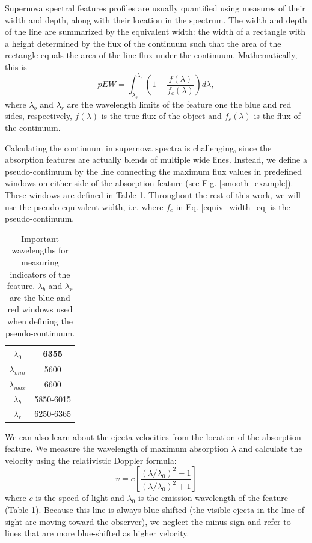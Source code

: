 Supernova spectral features profiles are usually quantified using measures of their width and depth, along with their location in the spectrum. The width and depth of the line are summarized by the equivalent width: the width of a rectangle with a height determined by the flux of the continuum such that the area of the rectangle equals the area of the line flux under the continuum. Mathematically, this is
\begin{equation}
    pEW = \displaystyle\int_{\lambda_b}^{\lambda_r}
    \left(1-\frac{f(\lambda)}{f_c(\lambda)}\right)d\lambda,
    \label{equiv_width_eq}
\end{equation}
where $\lambda_b$ and $\lambda_r$ are the wavelength limits of the feature one the blue and red sides, respectively, $f(\lambda)$ is the true flux of the object and $f_c(\lambda)$ is the flux of the continuum.

Calculating the continuum in supernova spectra is challenging, since the absorption features are actually blends of multiple wide lines. Instead, we define a pseudo-continuum by the line connecting the maximum flux values in predefined windows on either side of the absorption feature (see Fig. \ref{smooth_example}). These windows are defined in Table \ref{wavelength_ranges}. Throughout the rest of this work, we will use the pseudo-equivalent width, i.e. where $f_c$ in Eq. \ref{equiv_width_eq} is the pseudo-continuum.

\begin{table}[!htb]
    \centering
    \begin{tabular}{|c|c|}\hline
         $\lambda_0$ & 6355 \\\hline
         $\lambda_{min}$ & 5600 \\\hline
         $\lambda_{max}$ & 6600 \\\hline
         $\lambda_b$ & 5850-6015 \\\hline
         $\lambda_r$ & 6250-6365 \\\hline
    \end{tabular}
    \caption{Important wavelengths for measuring indicators of the \siliconii\; feature. $\lambda_b$ and $\lambda_r$ are the blue and red windows used when defining the pseudo-continuum.}
    \label{wavelength_ranges}
\end{table}

We can also learn about the ejecta velocities from the location of the absorption feature. We measure the wavelength of maximum absorption $\lambda$ and calculate the velocity using the relativistic Doppler formula:
\begin{equation}
v = c\left[\frac{(\lambda/\lambda_0)^2 -1}{(\lambda/\lambda_0)^2 +1}\right]
\label{doppler}
\end{equation}
where $c$ is the speed of light and $\lambda_0$ is the emission wavelength of the feature (Table \ref{wavelength_ranges}). Because this line is always blue-shifted (the visible ejecta in the line of sight are moving toward the observer), we neglect the minus sign and refer to lines that are more blue-shifted as higher velocity.

